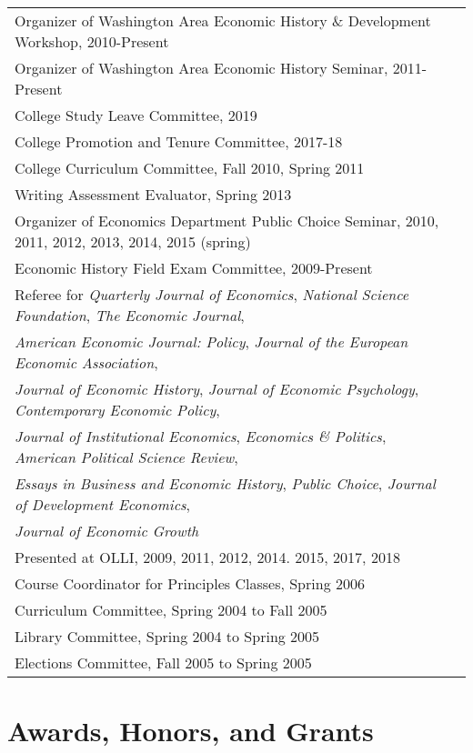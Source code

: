 \documentclass[11pt,fullpage]{article}
\begin{document}
\begin{tabular}{ll}
	Organizer of Washington Area Economic History \& Development Workshop, 2010-Present \\
	Organizer of Washington Area Economic History Seminar, 2011-Present \\
	College Study Leave Committee, 2019 \\
	College Promotion and Tenure Committee, 2017-18 \\
	College Curriculum Committee, Fall 2010, Spring 2011 \\
	Writing Assessment Evaluator, Spring 2013 \\ 
	Organizer of Economics Department Public Choice Seminar, 2010, 2011, 2012, 2013, 2014, 2015 (spring) \\
	Economic History Field Exam Committee, 2009-Present \\
	Referee for \textit{Quarterly Journal of Economics}, \textit{National Science Foundation}, \textit{The Economic Journal}, \\\textit{American Economic Journal:  Policy},  \textit{Journal of the European Economic Association}, \\\textit{Journal of Economic History}, \textit{Journal of Economic Psychology}, \textit{Contemporary Economic Policy},\\ \textit{Journal of Institutional Economics}, \textit{Economics \& Politics}, \textit{American Political Science Review}, \\ \textit{Essays in Business and Economic History}, \textit{Public Choice}, \textit{Journal of Development Economics}, \\ \textit{Journal of Economic Growth} \\ 
	Presented at OLLI, 2009, 2011, 2012, 2014. 2015, 2017, 2018 \\ 
	Course Coordinator for Principles Classes, Spring 2006 \\
	Curriculum Committee, Spring 2004 to Fall 2005 \\
	Library Committee, Spring 2004 to Spring 2005 \\
	Elections Committee, Fall 2005 to Spring 2005 \\
\end{tabular}	
	
\section*{Awards, Honors, and Grants}
\end{document}
